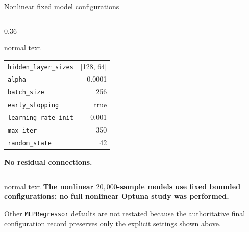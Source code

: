 \documentclass[aspectratio=169,10pt]{beamer}
\begin{document}
\begin{frame}[t]{Nonlinear fixed model configurations}
\begin{columns}[T,totalwidth=0.94\textwidth]
\begin{column}{0.36\textwidth}
\begin{beamercolorbox}[wd=\linewidth,sep=0.45em]{normal text}
\begin{tabular}{@{}lr@{}}
          \texttt{hidden\_layer\_sizes} & [128, 64]\\
          \texttt{alpha} & 0.0001\\
          \texttt{batch\_size} & 256\\
          \texttt{early\_stopping} & true\\
          \texttt{learning\_rate\_init} & 0.001\\
          \texttt{max\_iter} & 350\\
          \texttt{random\_state} & 42
        \end{tabular}\par
        \vspace{0.11cm}\scriptsize\color{GVCouplingOrange}\textbf{No residual connections.}
      \end{beamercolorbox}
    \end{column}
  \end{columns}
  \vspace{0.16cm}
  \begin{beamercolorbox}[wd=0.91\textwidth,sep=0.44em]{normal text}
    \scriptsize\textbf{\color{GVTitleRed}The nonlinear \(20{,}000\)-sample models use fixed bounded configurations; no full nonlinear Optuna study was performed.}\par
    \vspace{0.05cm}
    \tiny Other \texttt{MLPRegressor} defaults are not restated because the authoritative final configuration record preserves only the explicit settings shown above.
  \end{beamercolorbox}
\end{frame}
\end{document}
